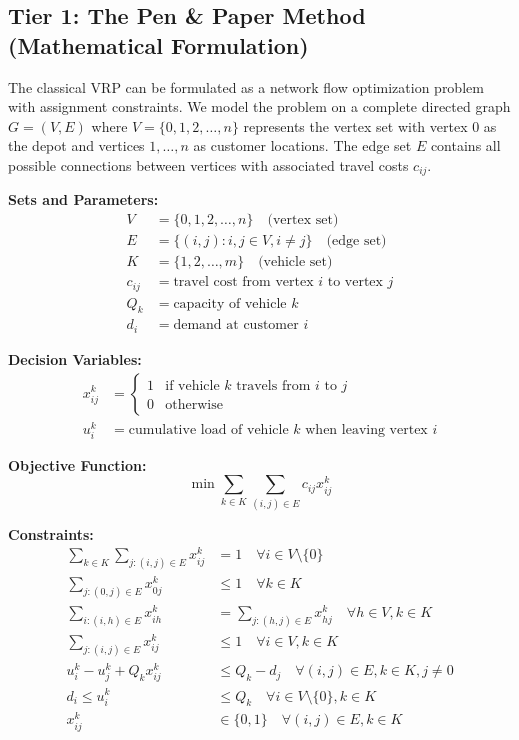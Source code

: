 \documentclass{article}
\begin{document}
\subsection{Tier 1: The Pen \& Paper Method (Mathematical Formulation)}

The classical VRP can be formulated as a network flow optimization problem with assignment constraints. We model the problem on a complete directed graph $G = (V, E)$ where $V = \{0, 1, 2, \ldots, n\}$ represents the vertex set with vertex 0 as the depot and vertices $1, \ldots, n$ as customer locations. The edge set $E$ contains all possible connections between vertices with associated travel costs $c_{ij}$.

\textbf{Sets and Parameters:}
\begin{align}
V &= \{0, 1, 2, \ldots, n\} \quad \text{(vertex set)} \\
E &= \{(i,j) : i, j \in V, i \neq j\} \quad \text{(edge set)} \\
K &= \{1, 2, \ldots, m\} \quad \text{(vehicle set)} \\
c_{ij} &= \text{travel cost from vertex } i \text{ to vertex } j \\
Q_k &= \text{capacity of vehicle } k \\
d_i &= \text{demand at customer } i
\end{align}

\textbf{Decision Variables:}
\begin{align}
x_{ij}^k &= \begin{cases}
1 & \text{if vehicle } k \text{ travels from } i \text{ to } j \\
0 & \text{otherwise}
\end{cases} \\
u_i^k &= \text{cumulative load of vehicle } k \text{ when leaving vertex } i
\end{align}

\textbf{Objective Function:}
\begin{equation}
\min \sum_{k \in K} \sum_{(i,j) \in E} c_{ij} x_{ij}^k
\end{equation}

\textbf{Constraints:}
\begin{align}
\sum_{k \in K} \sum_{j:(i,j) \in E} x_{ij}^k &= 1 \quad \forall i \in V \setminus \{0\} \tag{visit each customer exactly once} \\
\sum_{j:(0,j) \in E} x_{0j}^k &\leq 1 \quad \forall k \in K \tag{each vehicle leaves depot at most once} \\
\sum_{i:(i,h) \in E} x_{ih}^k &= \sum_{j:(h,j) \in E} x_{hj}^k \quad \forall h \in V, k \in K \tag{flow conservation} \\
\sum_{j:(i,j) \in E} x_{ij}^k &\leq 1 \quad \forall i \in V, k \in K \tag{degree constraint} \\
u_i^k - u_j^k + Q_k x_{ij}^k &\leq Q_k - d_j \quad \forall (i,j) \in E, k \in K, j \neq 0 \tag{capacity constraint} \\
d_i \leq u_i^k &\leq Q_k \quad \forall i \in V \setminus \{0\}, k \in K \tag{load bounds} \\
x_{ij}^k &\in \{0, 1\} \quad \forall (i,j) \in E, k \in K
\end{align}
\end{document}

